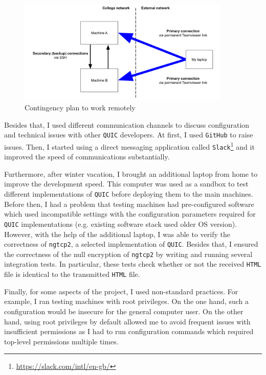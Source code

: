 \documentclass[12pt,a4paper,twoside,openright]{report}
\begin{document}
    \begin{figure}[ht]
    \centering
    \includegraphics[width=0.9\textwidth]{figs/Setup map.png}
    \caption[Contingency plan to work remotely]{Contingency plan to work remotely}
    \label{fig:setup_map}
    \end{figure}

    Besides that, I used different communication channels to discuss configuration and technical issues with other \texttt{QUIC} developers.
    At first, I used \texttt{GitHub} to raise issues.
    Then, I started using a direct messaging application called \texttt{Slack}\footnote{\url{https://slack.com/intl/en-gb/}} 
    and it improved the speed of communications substantially.

    Furthermore, after winter vacation, I brought an additional laptop from home to improve the development speed.
    This computer was used as a sandbox to test different implementations of \texttt{QUIC} before deploying them to the main machines.
    Before then, I had a problem that testing machines had pre-configured software which used incompatible settings with the configuration parameters required for \texttt{QUIC} implementations (e.g. existing software stack used older OS version).
    However, with the help of the additional laptop, I was able to verify the correctness of \texttt{ngtcp2}, a selected implementation of \texttt{QUIC}.
    Besides that, I ensured the correctness of the null encryption of \texttt{ngtcp2} by writing and running several integration tests.
    In particular, these tests check whether or not the received \texttt{HTML} file is identical to the transmitted \texttt{HTML} file.
    
    Finally, for some aspects of the project, I used non-standard practices.
    For example, I ran testing machines with root privileges.
    On the one hand, such a configuration would be insecure for the general computer user. On the other hand, using root privileges by default allowed me to avoid frequent issues with insufficient permissions as I had to run configuration commands which required top-level permissions multiple times.
    
\end{document}

